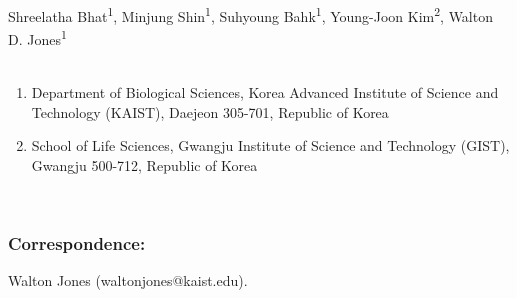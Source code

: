Shreelatha Bhat\textsuperscript{1}, Minjung Shin\textsuperscript{1}, Suhyoung Bahk\textsuperscript{1}, Young-Joon Kim\textsuperscript{2}, Walton D. Jones\textsuperscript{1}
\\
\\
\begin{enumerate}
\item Department of Biological Sciences, Korea Advanced Institute of Science and Technology (KAIST), Daejeon 305-701, Republic of Korea
\item School of Life Sciences, Gwangju Institute of Science and Technology (GIST), Gwangju 500-712, Republic of Korea
\end{enumerate}
\\
\subsubsection{Correspondence:}
Walton Jones (waltonjones@kaist.edu).